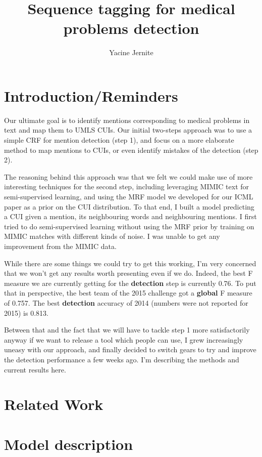 \documentclass[10pt,a4paper]{article}
\author{Yacine Jernite}
\title{Sequence tagging for medical problems detection}
\begin{document}
\maketitle

\section{Introduction/Reminders}

  Our ultimate goal is to identify mentions corresponding to medical problems in text and map them to UMLS CUIs. Our initial two-steps approach was to use a simple CRF for mention detection (step 1), and focus on a more elaborate method to map mentions to CUIs, or even identify mistakes of the detection (step 2).

  The reasoning behind this approach was that we felt we could make use of more interesting techniques for the second step, including leveraging MIMIC text for semi-supervised learning, and using the MRF model we developed for our ICML paper as a prior on the CUI distribution. To that end, I built a model predicting a CUI given a mention, its neighbouring words and neighbouring mentions. I first tried to do semi-supervised learning without using the MRF prior by training on MIMIC matches with different kinds of noise. I was unable to get any improvement from the MIMIC data. 
  
  While there are some things we could try to get this working, I'm very concerned that we won't get any results worth presenting even if we do. Indeed, the best F measure we are currently getting for the {\bf{detection}} step is currently 0.76. To put that in perspective, the best team of the 2015 challenge got a {\bf{global}} F measure of 0.757. The best {\bf{detection}} accuracy of 2014 (numbers were not reported for 2015) is 0.813.
  
  Between that and the fact that we will have to tackle step 1 more satisfactorily anyway if we want to release a tool which people can use, I grew increasingly uneasy with our approach, and finally decided to switch gears to try and improve the detection performance a few weeks ago. I'm describing the methods and current results here.

\section{Related Work}



\section{Model description}
\end{document}
